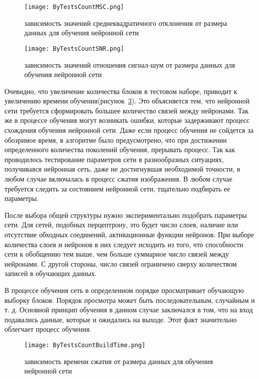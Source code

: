 \begin{figure}[ht]
\centering
  \texttt{[image: ByTestsCountMSC.png]}
  \caption{ зависимость значений среднеквадратичного отклонения от размера данных для обучения нейронной сети }
  \label{fig:by_tests_count_msc}
\end{figure}

\begin{figure}[ht]
\centering
  \texttt{[image: ByTestsCountSNR.png]}
  \caption{ зависимость значений отношения сигнал-шум от размера данных для обучения нейронной сети }
  \label{fig:by_tests_count_snr}
\end{figure}

Очевидно, что увеличение количества блоков в тестовом наборе, приводит к увеличению времени обучения(рисунок~\ref{fig:by_tests_count_build_time}).
Это объясняется тем, что нейронной сети требуется сформировать большее количество связей между нейронами. Так же в процессе обучения могут возникать ошибки,
которые задерживают процесс схождения обучения нейронной сети. Даже если процесс обучения не сойдется за обозримое время, в алгоритме было предусмотрено,
что при достижении определенного количества поколений обучения, прерывать процесс. Так как проводилось тестирование параметров сети в разнообразных ситуациях,
получиваяся нейронная сеть, даже не достигнувшая необходимой точности, в любом случае включалась в процесс сжатия изображения. В любом случае требуется следить
за состоянием нейронной сети, тщательно подбирать ее параметры.

После выбора общей структуры нужно экспериментально подобрать параметры сети.
Для сетей, подобных перцептрону, это будет число слоев, наличие или отсутствие обходных соединений, активационные функции нейронов.
При выборе количества слоев и нейронов в них следует исходить из того, что способности сети к обобщению тем выше, чем больше суммарное число
связей между нейронами. С другой стороны, число связей ограничено сверху количеством записей в обучающих данных.

В процессе обучения сеть в определенном порядке просматривает обучающую выборку блоков. Порядок просмотра может быть последовательным, случайным и т. д.
Основной принцип обучения в данном случае заключался в том, что на вход подавались данные, которые и ожидались на выходе. Этот факт значительно облегчает процесс обучения.

\begin{figure}[ht]
\centering
  \texttt{[image: ByTestsCountBuildTime.png]}
  \caption{ зависимость времени сжатия от размера данных для обучения нейронной сети }
  \label{fig:by_tests_count_build_time}
\end{figure}

